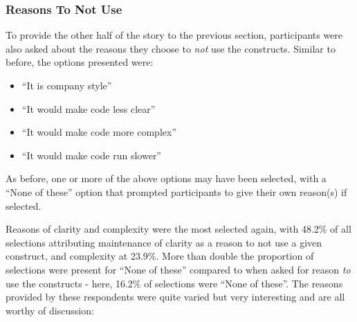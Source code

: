 \documentclass{article}
\begin{document}
        \newpage
        \subsubsection{Reasons To Not Use}
            To provide the other half of the story to the previous section, participants were also asked about the reasons they choose to \emph{not} use the constructs. Similar to before, the options presented were:
            \begin{itemize}
                \item ``It is company style''
                \item ``It would make code less clear''
                \item ``It would make code more complex''
                \item ``It would make code run slower''
            \end{itemize}
            As before, one or more of the above options may have been selected, with a ``None of these'' option that prompted participants to give their own reason(s) if selected.
            \newline

            Reasons of clarity and complexity were the most selected again, with 48.2\% of all selections attributing maintenance of clarity as a reason to not use a given construct, and complexity at 23.9\%. More than double the proportion of selections were present for ``None of these'' compared to when asked for reason \emph{to} use the constructs - here, 16.2\% of selections were ``None of these''. The reasons provided by these respondents were quite varied but very interesting and are all worthy of discussion:
\end{document}
